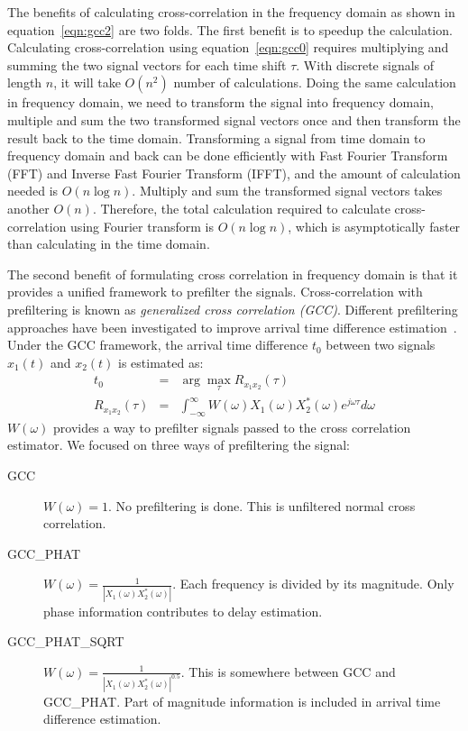 The benefits of calculating cross-correlation in the frequency domain as shown in equation~\ref{eqn:gcc2} are two folds. The first benefit is to speedup the calculation. Calculating cross-correlation using equation~\ref{eqn:gcc0} requires multiplying and summing the two signal vectors for each time shift $\tau$. With discrete signals of length $n$, it will take $O(n^2)$ number of calculations. Doing the same calculation in frequency domain, we need to transform the signal into frequency domain, multiple and sum the two transformed signal vectors once and then transform the result back to the time domain. Transforming a signal from time domain to frequency domain and back can be done efficiently with Fast Fourier Transform (FFT) and Inverse Fast Fourier Transform (IFFT), and the amount of calculation needed is $O(n\log n)$. Multiply and sum the transformed signal vectors takes another $O(n)$. Therefore, the total calculation required to calculate cross-correlation using Fourier transform is $O(n\log n)$, which is asymptotically faster than calculating in the time domain.

The second benefit of formulating cross correlation in frequency domain is that it provides a unified framework to prefilter the signals. Cross-correlation with prefiltering is known as \emph{generalized cross correlation (GCC)}. Different prefiltering approaches have been investigated to improve arrival time difference estimation~\cite{tdoa:gcc1,tdoa:gcc2,tdoa:gcc3}. Under the GCC framework, the arrival time difference $t_0$ between two signals $x_1(t)$ and $x_2(t)$ is estimated as:
\begin{eqnarray} \label{eq:gcc}
t_0 &=& \arg\max_{\tau} R_{x_1x_2}(\tau) \\\label{eq:gcc2}
R_{x_1x_2}(\tau) &=& \int_{-\infty}^\infty W(\omega) X_1(\omega) X_2^{*}(\omega) e^{j\omega\tau} d\omega
\end{eqnarray}
$W(\omega)$ provides a way to prefilter signals passed to the cross correlation estimator. We focused on three ways of prefiltering the signal:
\begin{description}%
\item[GCC] $W(\omega) = 1$. No prefiltering is done. This is unfiltered normal cross correlation.
\item[GCC\_PHAT] $W(\omega) = \frac{1}{\left|X_1(\omega)X_2^{*}(\omega)\right|}$. Each frequency is divided by its magnitude. Only phase information contributes to delay estimation.
\item[GCC\_PHAT\_SQRT] $W(\omega) = \frac{1}{\left|X_1(\omega)X_2^*(\omega)\right|^{0.5}}$. This is somewhere between GCC and GCC\_PHAT. Part of magnitude information is included in arrival time difference estimation.
\end{description}

